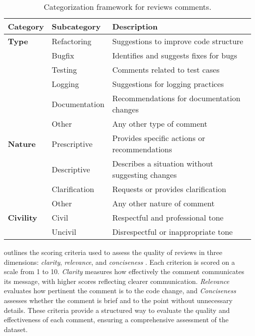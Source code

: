 \begin{table}[!t]
  \centering
  \caption{Categorization framework for reviews comments.}
  \label{tab:categories}
  \begin{tabularx}{\linewidth}{llX}
    \toprule
    \textbf{Category} & \textbf{Subcategory} & \textbf{Description} \\
    \midrule
    \textbf{Type} & Refactoring & Suggestions to improve code structure \\
                  & Bugfix & Identifies and suggests fixes for bugs \\
                  & Testing & Comments related to test cases \\
                  & Logging & Suggestions for logging practices \\
                  & Documentation & Recommendations for documentation changes \\
                  & Other & Any other type of comment \\
    \midrule
    \textbf{Nature} & Prescriptive & Provides specific actions or recommendations \\
                    & Descriptive & Describes a situation without suggesting changes \\
                    & Clarification & Requests or provides clarification \\
                    & Other & Any other nature of comment \\
    \midrule
    \textbf{Civility} & Civil & Respectful and professional tone \\
                      & Uncivil & Disrespectful or inappropriate tone \\
    \bottomrule
  \end{tabularx}
  \vspace{-1em}
\end{table}


 outlines the scoring criteria used to assess the quality of reviews in three dimensions: \emph{clarity}, \emph{relevance}, and \emph{conciseness} \cite{rani2023decade, haouari2011good}. Each criterion is scored on a scale from 1 to 10. \emph{Clarity} measures how effectively the comment communicates its message, with higher scores reflecting clearer communication. \emph{Relevance} evaluates how pertinent the comment is to the code change, and \emph{Conciseness} assesses whether the comment is brief and to the point without unnecessary details. These criteria provide a structured way to evaluate the quality and effectiveness of each comment, ensuring a comprehensive assessment of the dataset. 




